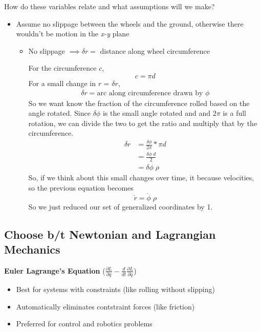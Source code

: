 How do these variables relate and what assumptions will we make?
\begin{itemize}
	\item Assume no slippage between the wheels and the ground, otherwise there wouldn't be motion in the \textit{x-y} plane
	\begin{itemize}
		\item No slippage $\implies \delta r = $ distance along wheel circumference
		
		For the circumference $c$,
		\begin{equation}
			c = \pi d
		\end{equation}
			For a small change in $r$ = $\delta r $,
		\begin{align}
			\delta r = \textrm{arc along circumference drawn by } \phi
		\end{align}
			So we want know the fraction of the circumference rolled based on the angle rotated. Since $\delta \phi$ is the small angle rotated and and $2 \pi$ is a full rotation, we can divide the two to get the ratio and multiply that by the circumference.
		\begin{align}
			\delta r & = \frac{\delta \phi}{2 \pi} * \pi d \\
					&	= \frac{\delta \phi \; d}{2} \\
					&	= \delta \phi \; \rho
		\end{align}
			So, if we think about this small changes over time, it because velocities, so the previous equation becomes
		\begin{equation}
			\dot{r} = \dot{\phi} \; \rho
		\end{equation}
		So we just reduced our set of generalized coordinates by 1.
	\end{itemize}
\end{itemize}

\subsection{Choose b/t Newtonian and Lagrangian Mechanics}
\textbf{Euler Lagrange's Equation} ($\frac{\partial L}{\partial q} - \frac{d}{dt} \frac{\partial L}{\partial \dot q}$)
\begin{itemize}
	\item Best for systems with constraints (like rolling without slipping)
	\item Automatically eliminates contstraint forces (like friction)
	\item Preferred for control and robotics problems
\end{itemize}

